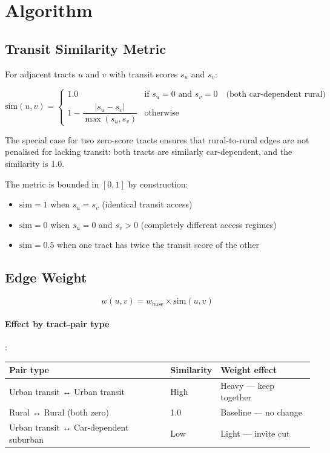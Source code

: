 \section{Algorithm}

\subsection{Transit Similarity Metric}

For adjacent tracts $u$ and $v$ with transit scores $s_u$ and $s_v$:

\[
  \text{sim}(u,v) = \begin{cases}
    1.0 & \text{if } s_u = 0 \text{ and } s_v = 0 \quad \text{(both car-dependent rural)} \\
    1 - \dfrac{|s_u - s_v|}{\max(s_u, s_v)} & \text{otherwise}
  \end{cases}
\]

The special case for two zero-score tracts ensures that rural-to-rural edges are not penalised for lacking transit: both tracts are similarly car-dependent, and the similarity is 1.0.

The metric is bounded in $[0,1]$ by construction:
\begin{itemize}
  \item $\text{sim} = 1$ when $s_u = s_v$ (identical transit access)
  \item $\text{sim} = 0$ when $s_u = 0$ and $s_v > 0$ (completely different access regimes)
  \item $\text{sim} = 0.5$ when one tract has twice the transit score of the other
\end{itemize}

\subsection{Edge Weight}

\[
  w(u,v) = w_{\text{base}} \times \text{sim}(u,v)
\]

\paragraph{Effect by tract-pair type}:

\begin{tabular}{lll}
\toprule
Pair type & Similarity & Weight effect \\
\midrule
Urban transit ↔ Urban transit & High & Heavy — keep together \\
Rural ↔ Rural (both zero) & 1.0 & Baseline — no change \\
Urban transit ↔ Car-dependent suburban & Low & Light — invite cut \\
\bottomrule
\end{tabular}
